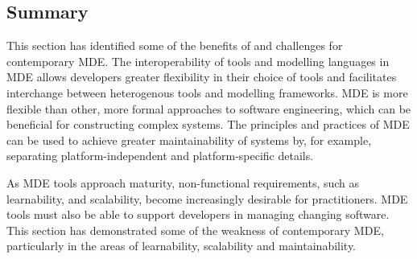 \subsection{Summary}
This section has identified some of the benefits of and challenges for contemporary MDE. The interoperability of tools and modelling languages in MDE allows developers greater flexibility in their choice of tools and facilitates interchange between heterogenous tools and modelling frameworks. MDE is more flexible than other, more formal approaches to software engineering, which can be beneficial for constructing complex systems. The principles and practices of MDE can be used to achieve greater maintainability of systems by, for example, separating platform-independent and platform-specific details.

As MDE tools approach maturity, non-functional requirements, such as learnability, and scalability, become increasingly desirable for practitioners. MDE tools must also be able to support developers in managing changing software. This section has demonstrated some of the weakness of contemporary MDE, particularly in the areas of learnability, scalability and maintainability.